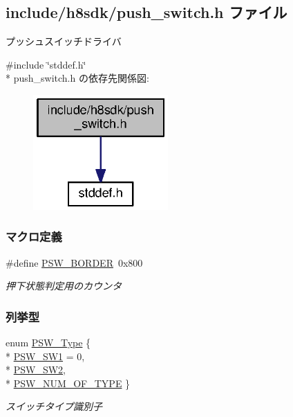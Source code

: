 \subsection{include/h8sdk/push\+\_\+switch.h ファイル}
\label{push__switch_8h}


プッシュスイッチドライバ  


{\ttfamily \#include \char`\"{}stddef.\+h\char`\"{}}\\*
push\+\_\+switch.\+h の依存先関係図\+:
\nopagebreak
\begin{figure}[H]
\begin{center}
\leavevmode
\includegraphics[width=146pt]{d7/d27/push__switch_8h__incl}
\end{center}
\end{figure}
\subsubsection*{マクロ定義}
\begin{DoxyCompactItemize}
\item 
\#define \hyperlink{push__switch_8h_aa47f0189e15d337406bc1bd760207db4_aa47f0189e15d337406bc1bd760207db4}{P\+S\+W\+\_\+\+B\+O\+R\+D\+E\+R}~0x800
\begin{DoxyCompactList}\small\item\em 押下状態判定用のカウンタ \end{DoxyCompactList}\end{DoxyCompactItemize}
\subsubsection*{列挙型}
\begin{DoxyCompactItemize}
\item 
enum \hyperlink{push__switch_8h_a66564168132ca9f7124309ee5b555b0c_a66564168132ca9f7124309ee5b555b0c}{P\+S\+W\+\_\+\+Type} \{ \\*
\hyperlink{push__switch_8h_a66564168132ca9f7124309ee5b555b0c_a66564168132ca9f7124309ee5b555b0cac1ec17c9c817febb900692b7025ebf0d}{P\+S\+W\+\_\+\+S\+W1} = 0, 
\\*
\hyperlink{push__switch_8h_a66564168132ca9f7124309ee5b555b0c_a66564168132ca9f7124309ee5b555b0cabdf66c87d4f6b20912cacee8492e318f}{P\+S\+W\+\_\+\+S\+W2}, 
\\*
\hyperlink{push__switch_8h_a66564168132ca9f7124309ee5b555b0c_a66564168132ca9f7124309ee5b555b0cad1e811a43a157b49b5f6d49725444817}{P\+S\+W\+\_\+\+N\+U\+M\+\_\+\+O\+F\+\_\+\+T\+Y\+P\+E}
 \}\begin{DoxyCompactList}\small\item\em スイッチタイプ識別子 \end{DoxyCompactList}
\end{DoxyCompactItemize}
